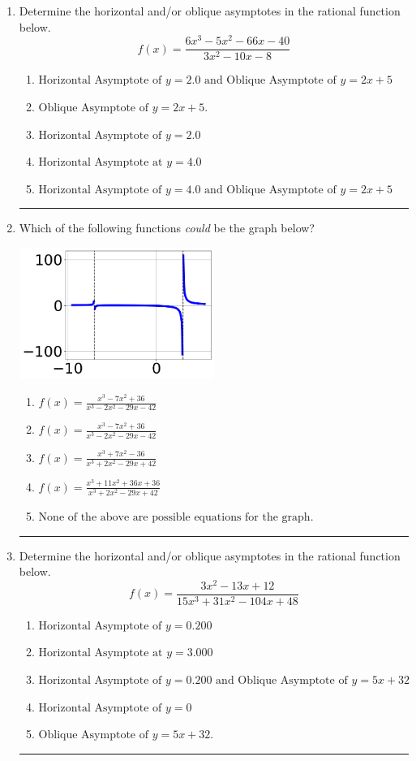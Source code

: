 \documentclass[14pt]{extbook}
\newcommand{\litem}[1]{\item#1\hspace*{-1cm}\rule{\textwidth}{0.4pt}}
\begin{document}
\begin{enumerate}
\litem{
Determine the horizontal and/or oblique asymptotes in the rational function below.\[ f(x) = \frac{6x^{3} -5 x^{2} -66 x -40}{3x^{2} -10 x -8} \]\begin{enumerate}[label=\Alph*.]
\item \( \text{Horizontal Asymptote of } y = 2.0 \text{ and Oblique Asymptote of } y = 2x + 5 \)
\item \( \text{Oblique Asymptote of } y = 2x + 5. \)
\item \( \text{Horizontal Asymptote of } y = 2.0  \)
\item \( \text{Horizontal Asymptote at } y = 4.0 \)
\item \( \text{Horizontal Asymptote of } y = 4.0 \text{ and Oblique Asymptote of } y = 2x + 5 \)

\end{enumerate} }
\litem{
Which of the following functions \textit{could} be the graph below?
\begin{center}
    \includegraphics[width=0.5\textwidth]{../Figures/identifyGraphOfRationalFunctionA.png}
\end{center}
\begin{enumerate}[label=\Alph*.]
\item \( f(x)=\frac{x^{3} -7 x^{2} + 36}{x^{3} -2 x^{2} -29 x -42} \)
\item \( f(x)=\frac{x^{3} -7 x^{2} + 36}{x^{3} -2 x^{2} -29 x -42} \)
\item \( f(x)=\frac{x^{3} +7 x^{2} -36}{x^{3} +2 x^{2} -29 x + 42} \)
\item \( f(x)=\frac{x^{3} +11 x^{2} +36 x + 36}{x^{3} +2 x^{2} -29 x + 42} \)
\item \( \text{None of the above are possible equations for the graph.} \)

\end{enumerate} }
\litem{
Determine the horizontal and/or oblique asymptotes in the rational function below.\[ f(x) = \frac{3x^{2} -13 x + 12}{15x^{3} +31 x^{2} -104 x + 48} \]\begin{enumerate}[label=\Alph*.]
\item \( \text{Horizontal Asymptote of } y = 0.200  \)
\item \( \text{Horizontal Asymptote at } y = 3.000 \)
\item \( \text{Horizontal Asymptote of } y = 0.200 \text{ and Oblique Asymptote of } y = 5x + 32 \)
\item \( \text{Horizontal Asymptote of } y = 0 \)
\item \( \text{Oblique Asymptote of } y = 5x + 32. \)


\end{enumerate}}
\end{enumerate}
\end{document}
